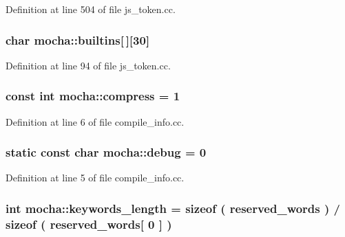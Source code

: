 Definition at line 504 of file js\_\-token.cc.

\hypertarget{namespacemocha_abc3ae3d8b9bb5cc5af9155e0b4b8039b}{
\subsubsection[{builtins}]{\setlength{\rightskip}{0pt plus 5cm}char {\bf mocha::builtins}\mbox{[}$\,$\mbox{]}\mbox{[}30\mbox{]}}}
\label{namespacemocha_abc3ae3d8b9bb5cc5af9155e0b4b8039b}


Definition at line 94 of file js\_\-token.cc.

\hypertarget{namespacemocha_a0e2da4823a390683f811a74c74b39905}{
\subsubsection[{compress}]{\setlength{\rightskip}{0pt plus 5cm}const int {\bf mocha::compress} = 1}}
\label{namespacemocha_a0e2da4823a390683f811a74c74b39905}


Definition at line 6 of file compile\_\-info.cc.

\hypertarget{namespacemocha_a6bb78f44a293fcc09ca593657bf9326c}{
\subsubsection[{debug}]{\setlength{\rightskip}{0pt plus 5cm}static const char {\bf mocha::debug} = 0}}
\label{namespacemocha_a6bb78f44a293fcc09ca593657bf9326c}


Definition at line 5 of file compile\_\-info.cc.

\hypertarget{namespacemocha_ad1eae732a8341d26760d4c2f414bba27}{
\subsubsection[{keywords\_\-length}]{\setlength{\rightskip}{0pt plus 5cm}int {\bf mocha::keywords\_\-length} = sizeof ( {\bf reserved\_\-words} ) / sizeof ( {\bf reserved\_\-words}\mbox{[} 0 \mbox{]} )}}
\label{namespacemocha_ad1eae732a8341d26760d4c2f414bba27}


